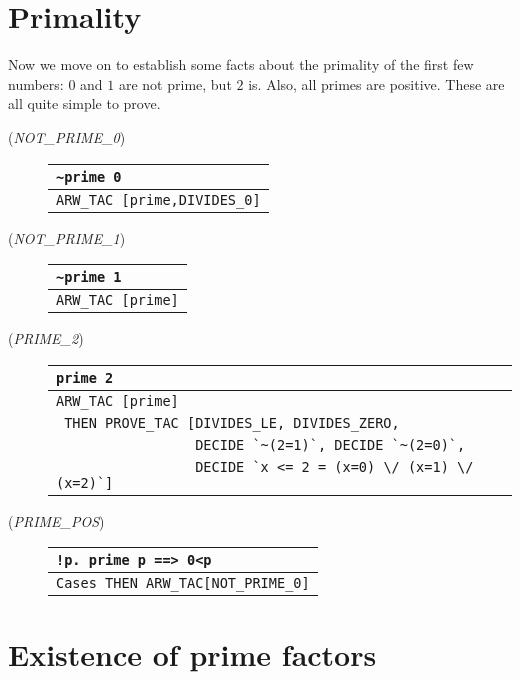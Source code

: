 \section{Primality}

Now we move on to establish some facts about the primality of the
first few numbers: $0$ and $1$ are not prime, but $2$ is. Also, all
primes are positive. These are all quite simple to prove.

\begin{description}

\item [\small{({\it NOT\_PRIME\_0\/})}]
\begin{tabular}[t]{l}
\verb+~prime 0+ \\ \hline
\verb+ARW_TAC [prime,DIVIDES_0]+ \\
\end{tabular}

\item
[\small{({\it NOT\_PRIME\_1\/})}]
\begin{tabular}[t]{l}
\verb+~prime 1+ \\ \hline
\verb+ARW_TAC [prime]+ \\
\end{tabular}

\item
[\small{({\it PRIME\_2\/})}]
\begin{tabular}[t]{l}
\verb+prime 2+ \\ \hline
\verb+ARW_TAC [prime]+ \\
\verb+ THEN PROVE_TAC [DIVIDES_LE, DIVIDES_ZERO,+ \\
\verb+                 DECIDE `~(2=1)`, DECIDE `~(2=0)`,+ \\
\verb+                 DECIDE `x <= 2 = (x=0) \/ (x=1) \/ (x=2)`]+ \\
\end{tabular}

\item
[\small{({\it PRIME\_POS\/})}]
\begin{tabular}[t]{l}
\verb+!p. prime p ==> 0<p+ \\ \hline
\verb+Cases THEN ARW_TAC[NOT_PRIME_0]+ \\
\end{tabular}
\end{description}

\section{Existence of prime factors}

